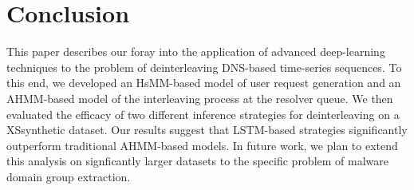 \section{Conclusion}

This paper describes our foray into the application of advanced 
deep-learning techniques to the problem of deinterleaving DNS-based
time-series sequences.  To this end, we developed an HsMM-based model
of user request generation and an AHMM-based model of the interleaving
process at the resolver queue.  We then evaluated the efficacy of two
different inference strategies for deinterleaving on a XSsynthetic
dataset.  Our results suggest that LSTM-based strategies significantly
outperform traditional AHMM-based models.  In future work, we plan to
extend this analysis on signficantly larger datasets to the specific
problem of malware domain group extraction.

